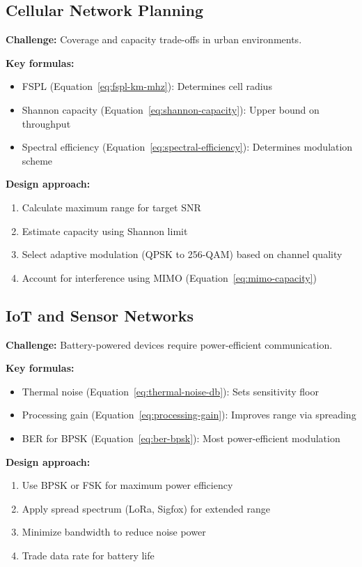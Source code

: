 \subsection{Cellular Network Planning}

\textbf{Challenge:} Coverage and capacity trade-offs in urban environments.

\textbf{Key formulas:}
\begin{itemize}
\item FSPL (Equation~\ref{eq:fspl-km-mhz}): Determines cell radius
\item Shannon capacity (Equation~\ref{eq:shannon-capacity}): Upper bound on throughput
\item Spectral efficiency (Equation~\ref{eq:spectral-efficiency}): Determines modulation scheme
\end{itemize}

\textbf{Design approach:}
\begin{enumerate}
\item Calculate maximum range for target SNR
\item Estimate capacity using Shannon limit
\item Select adaptive modulation (QPSK to 256-QAM) based on channel quality
\item Account for interference using MIMO (Equation~\ref{eq:mimo-capacity})
\end{enumerate}

\subsection{IoT and Sensor Networks}

\textbf{Challenge:} Battery-powered devices require power-efficient communication.

\textbf{Key formulas:}
\begin{itemize}
\item Thermal noise (Equation~\ref{eq:thermal-noise-db}): Sets sensitivity floor
\item Processing gain (Equation~\ref{eq:processing-gain}): Improves range via spreading
\item BER for BPSK (Equation~\ref{eq:ber-bpsk}): Most power-efficient modulation
\end{itemize}

\textbf{Design approach:}
\begin{enumerate}
\item Use BPSK or FSK for maximum power efficiency
\item Apply spread spectrum (LoRa, Sigfox) for extended range
\item Minimize bandwidth to reduce noise power
\item Trade data rate for battery life
\end{enumerate}

